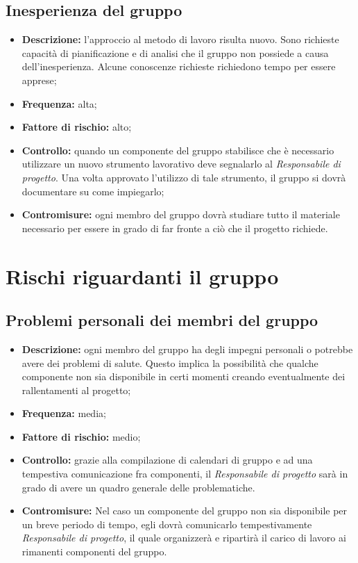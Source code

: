 \documentclass[./PianodiProgetto.tex]{subfiles}
\begin{document}
\subsection{Inesperienza del gruppo}
\begin{itemize}
	\item \textbf{Descrizione:} l'approccio al metodo di lavoro risulta nuovo. Sono richieste capacità di pianificazione e di analisi che il gruppo non possiede a causa dell'inesperienza. Alcune conoscenze richieste richiedono tempo per essere apprese;
	\item \textbf{Frequenza:} alta;
	\item \textbf{Fattore di rischio:} alto;
	\item \textbf{Controllo:} quando un componente del gruppo stabilisce che è necessario utilizzare un nuovo strumento lavorativo deve segnalarlo al  \textit{Responsabile di progetto}. Una volta approvato l'utilizzo di tale strumento, il gruppo si dovrà documentare su come impiegarlo;
	\item \textbf{Contromisure:} ogni membro del gruppo dovrà studiare tutto il materiale necessario per essere in grado di far fronte  a ciò che il progetto richiede.
\end{itemize}

\section{Rischi riguardanti il gruppo}
\subsection{Problemi personali dei membri del gruppo}
\begin{itemize}
	\item \textbf{Descrizione:} ogni membro del gruppo ha degli impegni personali o potrebbe avere dei problemi di salute. Questo implica la possibilità che qualche componente non sia disponibile in certi momenti creando eventualmente dei rallentamenti al progetto;
	\item \textbf{Frequenza:} media;
	\item \textbf{Fattore di rischio:} medio;
	\item \textbf{Controllo:} grazie alla compilazione di calendari di gruppo e ad una tempestiva comunicazione fra componenti, il \textit{Responsabile di progetto} sarà in grado di avere un quadro generale delle problematiche.
	\item \textbf{Contromisure:} Nel caso un componente del gruppo non sia disponibile per un breve periodo di tempo, egli dovrà comunicarlo tempestivamente \textit{Responsabile di progetto}, il quale organizzerà e ripartirà il carico di lavoro ai rimanenti componenti del gruppo. 
\end{itemize}
\end{document}
